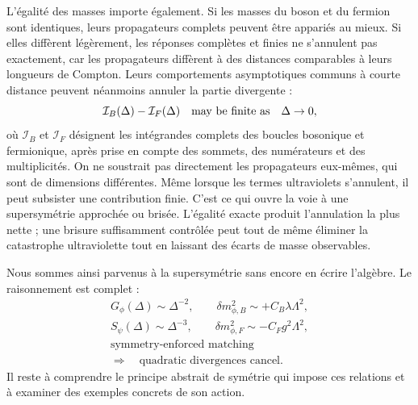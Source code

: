 L’égalité des masses importe également. Si les masses du boson et du fermion sont identiques, leurs propagateurs complets peuvent être appariés au mieux. Si elles diffèrent légèrement, les réponses complètes et finies ne s’annulent pas exactement, car les propagateurs diffèrent à des distances comparables à leurs longueurs de Compton. Leurs comportements asymptotiques communs à courte distance peuvent néanmoins annuler la partie divergente :
\begin{equation}
\mathcal I_B(\Delta)-\mathcal I_F(\Delta)
\quad\hbox{may be finite as}\quad \Delta\to0,
\end{equation}
où \(\mathcal I_B\) et \(\mathcal I_F\) désignent les intégrandes complets des boucles bosonique et fermionique, après prise en compte des sommets, des numérateurs et des multiplicités. On ne soustrait pas directement les propagateurs eux-mêmes, qui sont de dimensions différentes. Même lorsque les termes ultraviolets s’annulent, il peut subsister une contribution finie. C’est ce qui ouvre la voie à une supersymétrie approchée ou brisée. L’égalité exacte produit l’annulation la plus nette ; une brisure suffisamment contrôlée peut tout de même éliminer la catastrophe ultraviolette tout en laissant des écarts de masse observables.

Nous sommes ainsi parvenus à la supersymétrie sans encore en écrire l’algèbre. Le raisonnement est complet :
\begin{equation}
\begin{gathered}
G_\phi(\Delta)\sim \Delta^{-2},
\qquad
\delta m_{\phi,B}^2\sim+C_B\lambda\Lambda^2,\\[0.4em]
S_\psi(\Delta)\sim \Delta^{-3},
\qquad
\delta m_{\phi,F}^2\sim-C_Fg^2\Lambda^2,\\[0.4em]
\text{symmetry-enforced matching}\\
\Longrightarrow\quad
\text{quadratic divergences cancel}.
\end{gathered}
\end{equation}
Il reste à comprendre le principe abstrait de symétrie qui impose ces relations et à examiner des exemples concrets de son action.

